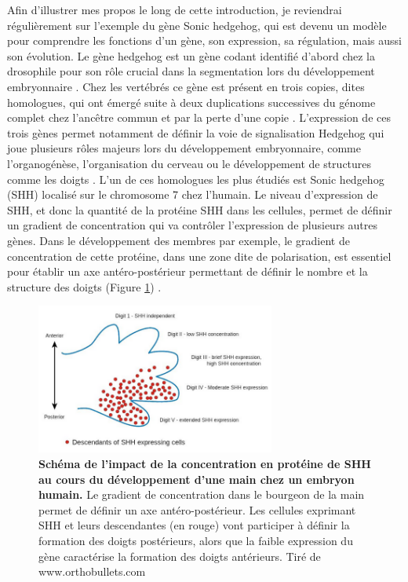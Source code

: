 Afin d’illustrer mes propos le long de cette introduction, je reviendrai régulièrement sur l’exemple du gène Sonic hedgehog, qui est devenu un modèle pour comprendre les fonctions d’un gène, son expression, sa régulation, mais aussi son évolution. Le gène hedgehog est un gène codant identifié d’abord chez la drosophile pour son rôle crucial dans la segmentation lors du développement embryonnaire \citep{nusslein-volhard_mutations_1980}. Chez les vertébrés ce gène est présent en trois copies, dites homologues, qui ont émergé suite à deux duplications successives du génome complet chez l’ancêtre commun et par la perte d’une copie \citep{dehal_two_2005}. L’expression de ces trois gènes permet notamment de définir la voie de signalisation Hedgehog qui joue plusieurs rôles majeurs lors du développement embryonnaire, comme l’organogénèse, l’organisation du cerveau ou le développement de structures comme les doigts \citep{lum_hedgehog_2004}. L’un de ces homologues les plus étudiés est Sonic hedgehog (\acrshort{SHH}) localisé sur le chromosome 7 chez l’humain. Le niveau d’expression de \acrshort{SHH}, et donc la quantité de la protéine \acrshort{SHH} dans les cellules, permet de définir un gradient de concentration qui va contrôler l’expression de plusieurs autres gènes. Dans le développement des membres par exemple, le gradient de concentration de cette protéine, dans une zone dite de polarisation, est essentiel pour établir un axe antéro-postérieur permettant de définir le nombre et la structure des doigts (Figure \ref{fig:Fig1}) \citep{riddle_sonic_1993, echelard_sonic_1993}.

\begin{figure}[h]
    \centering
    \includegraphics[width=0.7\textwidth, page=1] {figures/introduction/fig1.png}
    \caption[Schéma de l'impact de la concentration en protéine de \acrshort{SHH} au cours du développement d'une main chez un embryon humain.]{
    \textbf{Schéma de l'impact de la concentration en protéine de \acrshort{SHH} au cours du développement d'une main chez un embryon humain.} Le gradient de concentration dans le bourgeon de la main permet de définir un axe antéro-postérieur. Les cellules exprimant \acrshort{SHH} et leurs descendantes (en rouge) vont participer à définir la formation des doigts postérieurs, alors que la faible expression du gène caractérise la formation des doigts antérieurs. 
    Tiré de www.orthobullets.com\\
    }
    \label{fig:Fig1}
\end{figure} 


